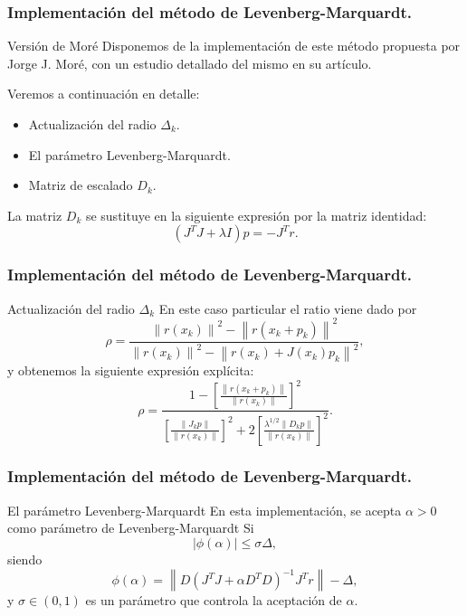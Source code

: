 \documentclass{beamer}
\newcommand{\norm}[1]{\left\lVert#1\right\rVert}
\begin{document}
\begin{frame}
    \frametitle{Implementación del método de Levenberg-Marquardt.}
    \begin{block}{Versión de Moré}
        Disponemos de la implementación de este método propuesta por Jorge J. Moré,
        con un estudio detallado del mismo en su artículo.
    \end{block} \pause
    \begin{block}{Veremos a continuación en detalle:}
        \begin{itemize}[label=\textbullet]
            \item Actualización del radio $\Delta_k$. \pause
            \item El parámetro Levenberg-Marquardt. \pause
            \item Matriz de escalado $D_k$. \pause
        \end{itemize}
        La matriz $D_k$ se sustituye en la siguiente expresión por la matriz identidad:
        \begin{equation*}
            (J^TJ+\lambda I)p=-J^Tr.
        \end{equation*}
    \end{block}
\end{frame}

\begin{frame}
    \frametitle{Implementación del método de Levenberg-Marquardt.}
    \begin{block}{Actualización del radio $\Delta_k$}
        En este caso particular el ratio viene dado por
        \begin{equation*}
	        \rho = \frac{\norm{r(x_k)}^2-\norm{r(x_k+p_k)}^2}{\norm{r(x_k)}^2-\norm{r(x_k)+J(x_k)p_k}^2},
        \end{equation*}
        y obtenemos la siguiente expresión explícita:
        \begin{equation*}
            \rho = \frac{1-\left[\frac{\norm{r(x_k+p_k)}}{\norm{r(x_k)}}\right]^2}
                        {\left[\frac{\norm{J_kp}}{\norm{r(x_k)}}\right]^2
                        + 2\left[\frac{\lambda^{1/2}\norm{D_kp}}{\norm{r(x_k)}}\right]^2}.
        \end{equation*}
    \end{block}
\end{frame}

\begin{frame}
    \frametitle{Implementación del método de Levenberg-Marquardt.}
    \begin{block}{El parámetro Levenberg-Marquardt}
        En esta implementación, se acepta $\alpha>0$ como parámetro de Levenberg-Marquardt Si
        \begin{equation*}
            |\phi(\alpha)| \leq \sigma\Delta,
        \end{equation*}
        siendo
        \begin{equation*}
            \phi(\alpha) = \norm{D(J^TJ+\alpha D^TD)^{-1}J^Tr}-\Delta,
        \end{equation*}
        y $\sigma \in (0,1)$ es un parámetro que controla la aceptación de $\alpha$. 
    \end{block}
\end{frame}
\end{document}
